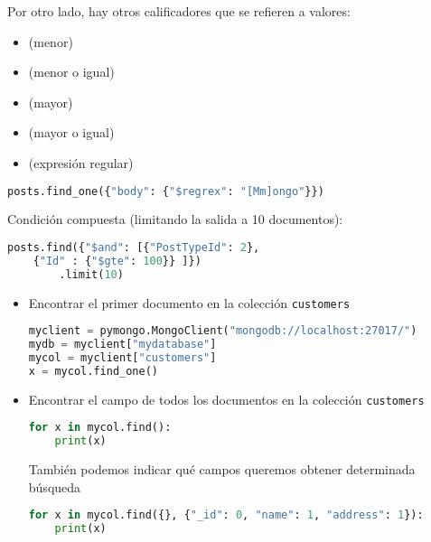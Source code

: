 Por otro lado, hay otros calificadores que se refieren a valores:
\begin{itemize}
	\item {} (menor)
	\item {} (menor o igual)
	\item {} (mayor)
	\item {} (mayor o igual)
	\item {} (expresión regular)
\end{itemize}
\begin{lstlisting}[language=python]
posts.find_one({"body": {"$regrex": "[Mm]ongo"}})
\end{lstlisting}
Condición compuesta (limitando la salida a 10 documentos):
\begin{lstlisting}[language=python]
posts.find({"$and": [{"PostTypeId": 2},
	{"Id" : {"$gte": 100}} ]})
		.limit(10)
\end{lstlisting}
\begin{itemize}[leftmargin=*]
	\item Encontrar el primer documento en la colección \texttt{customers}
	\begin{lstlisting}[language=python]
myclient = pymongo.MongoClient("mongodb://localhost:27017/")
mydb = myclient["mydatabase"]
mycol = myclient["customers"]
x = mycol.find_one()
	\end{lstlisting}
	\item Encontrar el campo de todos los documentos en la colección \texttt{customers}
\begin{lstlisting}[language=python]
for x in mycol.find():
	print(x)
\end{lstlisting}
También podemos indicar qué campos queremos obtener determinada búsqueda
\begin{lstlisting}[language=python]
for x in mycol.find({}, {"_id": 0, "name": 1, "address": 1}):
	print(x)
\end{lstlisting}
\end{itemize}
